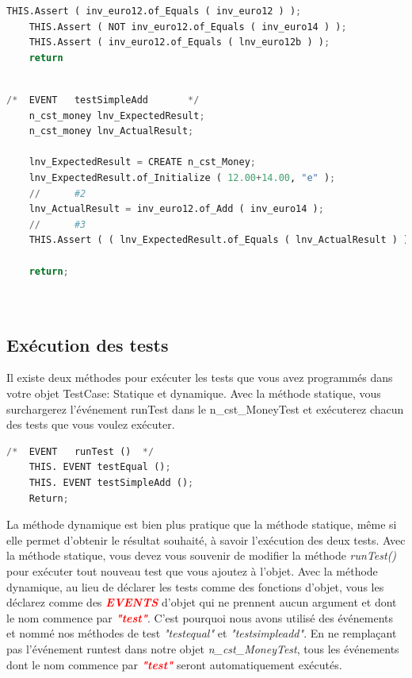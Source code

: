 \documentclass[a4paper,11pt,french]{report}
\theoremstyle{definition}
\begin{document}
\begin{itemize}
\begin{lstlisting}[language=Python, caption=Test d'egalité sans la logique du d'initialisation]
    THIS.Assert ( inv_euro12.of_Equals ( inv_euro12 ) );
    THIS.Assert ( NOT inv_euro12.of_Equals ( inv_euro14 ) );
    THIS.Assert ( inv_euro12.of_Equals ( lnv_euro12b ) );
    return
    
\end{lstlisting}


\begin{lstlisting}[language=Python, caption=Test d'ajout simple sans la logique du d'initialisation]
    /*	EVENT	testSimpleAdd		*/
    n_cst_money	lnv_ExpectedResult;
    n_cst_money	lnv_ActualResult;
    
    lnv_ExpectedResult = CREATE n_cst_Money;
    lnv_ExpectedResult.of_Initialize ( 12.00+14.00, "e" );
    //		#2
    lnv_ActualResult = inv_euro12.of_Add ( inv_euro14 );
    //		#3
    THIS.Assert ( ( lnv_ExpectedResult.of_Equals ( lnv_ActualResult ) ) );
    
    return;
    
    
\end{lstlisting}

\end{itemize}
\subsection{Exécution des tests}
Il existe deux méthodes pour exécuter les tests que vous avez programmés dans votre objet TestCase:  Statique et dynamique.
 Avec la méthode statique, vous surchargerez l'événement runTest dans le n\_cst\_MoneyTest et exécuterez chacun des tests que vous voulez exécuter.


\begin{lstlisting}[language=Python, caption= Redefinition de l'evènement \textit{runTest}]
    /*	EVENT	runTest ()	*/
    THIS. EVENT testEqual ();
    THIS. EVENT testSimpleAdd ();
    Return;
\end{lstlisting}
La méthode dynamique est bien plus pratique que la méthode statique, même si elle permet d'obtenir le résultat souhaité, à savoir l'exécution des deux tests. 
 Avec la méthode statique, vous devez vous souvenir de modifier la méthode \textit{runTest()} pour exécuter tout nouveau test que vous ajoutez à l'objet.
 Avec la méthode dynamique, au lieu de déclarer les tests comme des fonctions d'objet, vous les déclarez comme des \textbf{\textit{\textcolor{red}{EVENTS}}} d'objet qui ne prennent aucun argument et dont le nom commence par \textbf{\textit{\textcolor{red}{"test"}}}.
 C'est pourquoi nous avons utilisé des événements et nommé nos méthodes de test \textit{"testequal"} et \textit{"testsimpleadd"}.
   En ne remplaçant pas l'événement runtest dans notre objet \textit{n\_cst\_MoneyTest}, tous les événements dont le nom commence par  \textbf{\textit{\textcolor{red}{"test"}}} seront automatiquement exécutés.
\end{document}
